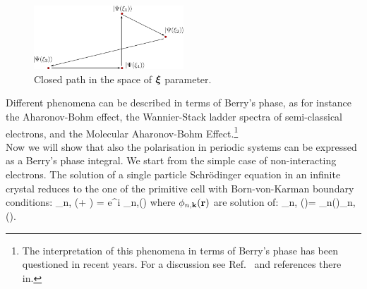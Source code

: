 \begin{figure}[ht]
  \begin{center}
    \includegraphics[width=0.5\textwidth]{Figures/berrypath}
  \end{center}
  \caption{Closed path in the space of $\boldsymbol{\xi}$ parameter. \label{closedpath}}
\end{figure}
Different phenomena can be described in terms of Berry's phase, as for instance the Aharonov-Bohm effect\cite{wilczek1989geometric}, the Wannier-Stack ladder spectra of semi-classical electrons\cite{zak1989berry}, and the Molecular Aharonov-Bohm Effect.\footnote{The interpretation of this phenomena in terms of Berry's phase has been questioned in recent years. For a discussion see Ref.~\cite{min2014molecular} and references there in.}\\
Now we will show that also the polarisation in periodic systems can be expressed as a Berry's phase integral. We start from the simple case of non-interacting electrons.
The solution of a single particle  Schr\"{o}dinger equation in an infinite crystal reduces to the one of the primitive cell with Born-von-Karman boundary conditions:
\be
\phi_{n,\kk} (\rr + \RR) = e^{i\kk \rr} \phi_{n,\kk}(\rr)
\ee
where $\phi_{n,{\bf k}} ({\bf r})$ are solution of:
\be
{} \phi_{n,\kk} (\rr)= \epsilon_n(\kk)\phi_{n,\kk} (\rr).
\label{schonebody}
\ee

